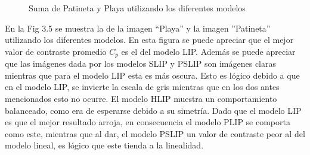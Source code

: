 \begin{figure}
\begin{center}
		\caption{Suma de Patineta y Playa utilizando los diferentes modelos}
	\end{center}
\end{figure}

En la Fig 3.5 se muestra la de la imagen  ``Playa'' y la imagen ''Patineta'' utilizando los diferentes modelos. En esta figura se puede apreciar que el mejor valor de contraste promedio $C_p$ es el del modelo LIP. Adem\'as se puede apreciar que las im\'agenes dada por los modelos SLIP y PSLIP son im\'agenes claras mientras que para el modelo LIP esta es m\'as oscura. Esto es l\'ogico debido a que en el modelo LIP, se invierte la escala de gris mientras que en los dos antes mencionados esto no ocurre. El modelo HLIP muestra un comportamiento balanceado, como era de esperarse debido a su simetr\'ia. Dado que el modelo LIP es que el mejor resultado arroja, en consecuencia el modelo PLIP se comporta como este, mientras que al dar, el modelo PSLIP un valor de contraste peor al del modelo lineal, es l\'ogico que este tienda a la linealidad.

